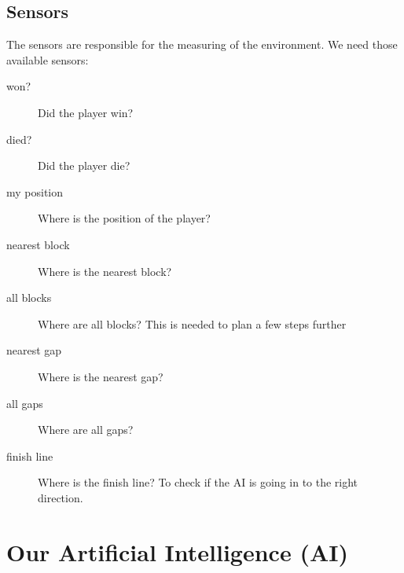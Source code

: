 \subsection{Sensors}
The sensors are responsible for the measuring of the environment. We need those available sensors:
\begin{description}
  \item[won?] Did the player win?
  \item[died?] Did the player die?
  \item[my position] Where is the position of the player?
  \item[nearest block] Where is the nearest block?
  \item[all blocks] Where are all blocks? This is needed to plan a few steps further
  \item[nearest gap] Where is the nearest gap?
  \item[all gaps] Where are all gaps?
  \item[finish line] Where is the finish line? To check if the AI is going in to the right direction.
\end{description}

\section{Our Artificial Intelligence (AI)}
